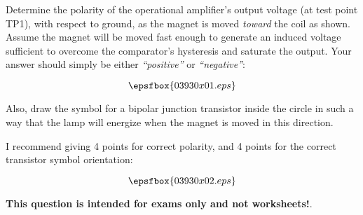 

Determine the polarity of the operational amplifier's output voltage (at test point TP1), with respect to ground, as the magnet is moved {\it toward} the coil as shown.  Assume the magnet will be moved fast enough to generate an induced voltage sufficient to overcome the comparator's hysteresis and saturate the output.  Your answer should simply be either {\it ``positive''} or {\it ``negative''}:

$$\epsfbox{03930x01.eps}$$

Also, draw the symbol for a bipolar junction transistor inside the circle in such a way that the lamp will energize when the magnet is moved in this direction.







I recommend giving 4 points for correct polarity, and 4 points for the correct transistor symbol orientation:

$$\epsfbox{03930x02.eps}$$







{\bf This question is intended for exams only and not worksheets!}.



